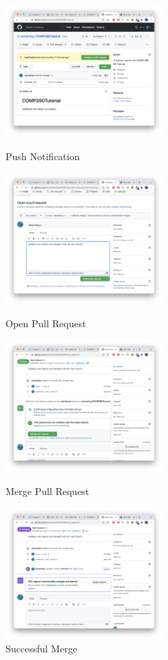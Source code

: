 \documentclass{article}
\begin{document}
\begin{figure}
    \centering
    \begin{minipage}{0.45\textwidth}
        \centering
        \includegraphics[width=6cm]{pr1.png}
        \caption{Push Notification}
    \end{minipage}\hfill
    \begin{minipage}{0.45\textwidth}
        \centering
        \includegraphics[width=6cm]{pr2.png}
        \caption{Open Pull Request}
    \end{minipage}\hfill
    \begin{minipage}{0.45\textwidth}
        \centering
        \includegraphics[width=6cm]{pr3.png}
        \caption{Merge Pull Request}
    \end{minipage}\hfill
    \begin{minipage}{0.45\textwidth}
        \centering
        \includegraphics[width=6cm]{pr4.png}
        \caption{Successful Merge}
    \end{minipage}
\end{figure}
\end{document}

